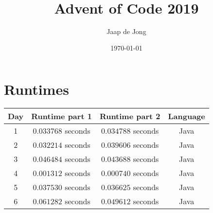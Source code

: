 \documentclass[]{report}
\title{Advent of Code 2019}
\author{Jaap de Jong}
\date{\today}
\begin{document}
	\maketitle
	\chapter{Runtimes}
	\begin{center}
		\begin{tabular}{|c|c|c|c|}
			\hline
			\textbf{Day} & \textbf{Runtime part 1} & \textbf{Runtime part 2} & \textbf{Language}\\
			\hline
			1 & $0.033768$ seconds & $0.034788$ seconds & Java \\
			2 & $0.032214$ seconds & $0.039606$ seconds & Java \\
			3 & $0.046484$ seconds & $0.043688$ seconds & Java \\
			4 & $0.001312$ seconds & $0.000740$ seconds & Java \\
			5 & $0.037530$ seconds & $0.036625$ seconds & Java \\
			6 & $0.061282$ seconds & $0.049612$ seconds & Java \\
			\hline
		\end{tabular}
	\end{center}
\end{document}
